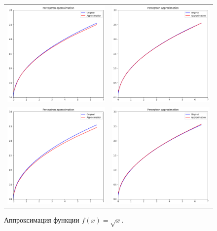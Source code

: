 \documentclass[12pt, a4paper]{article}
\begin{document}
    \begin{figure}[h]
        \center
        \begin{tabular}{cc}
            \includegraphics[width = 7cm]{f11_3_1.png}
            &
            \includegraphics[width = 7cm]{f11_3_2.png} \\
            \includegraphics[width = 7cm]{f11_3_3.png}
            &
            \includegraphics[width = 7cm]{f11_3_4.png} \\
        \end{tabular}
        \label{image3}
        \caption{Аппроксимация функции $f(x) = \sqrt{x}$.}
    \end{figure}
    
\end{document}
